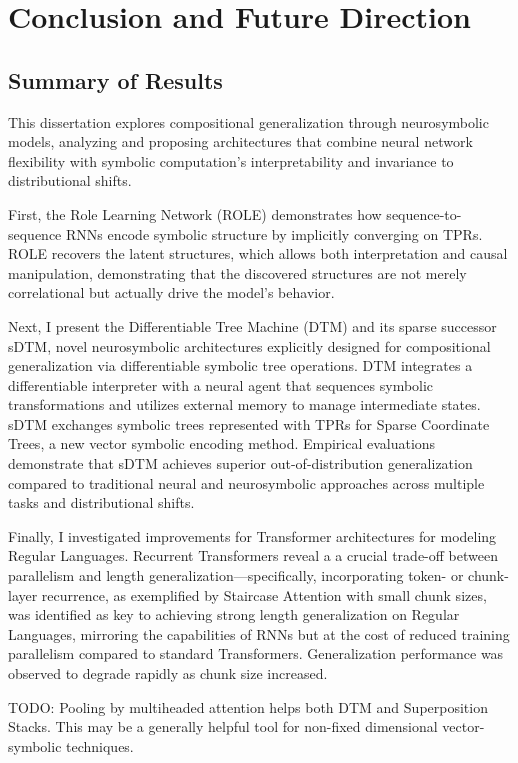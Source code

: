 \chapter{Conclusion and Future Direction} \label{chap:chap-6}
\section{Summary of Results}

This dissertation explores compositional generalization through neurosymbolic models, analyzing and proposing architectures that combine neural network flexibility with symbolic computation's interpretability and invariance to distributional shifts.

First, the Role Learning Network (ROLE) demonstrates how sequence-to-sequence RNNs encode symbolic structure by implicitly converging on TPRs. ROLE recovers the latent structures, which allows both interpretation and causal manipulation, demonstrating that the discovered structures are not merely correlational but actually drive the model's behavior.

Next, I present the Differentiable Tree Machine (DTM) and its sparse successor sDTM, novel neurosymbolic architectures explicitly designed for compositional generalization via differentiable symbolic tree operations. DTM integrates a differentiable interpreter with a neural agent that sequences symbolic transformations and utilizes external memory to manage intermediate states. sDTM exchanges symbolic trees represented with TPRs for Sparse Coordinate Trees, a new vector symbolic encoding method. Empirical evaluations demonstrate that sDTM achieves superior out-of-distribution generalization compared to traditional neural and neurosymbolic approaches across multiple tasks and distributional shifts.
 
Finally, I investigated improvements for Transformer architectures for modeling Regular Languages. Recurrent Transformers reveal a a crucial trade-off between parallelism and length generalization—specifically, incorporating token- or chunk- layer recurrence, as exemplified by Staircase Attention with small chunk sizes, was identified as key to achieving strong length generalization on Regular Languages, mirroring the capabilities of RNNs but at the cost of reduced training parallelism compared to standard Transformers. Generalization performance was observed to degrade rapidly as chunk size increased.

TODO: Pooling by multiheaded attention helps both DTM and Superposition Stacks. This may be a generally helpful tool for non-fixed dimensional vector-symbolic techniques.

